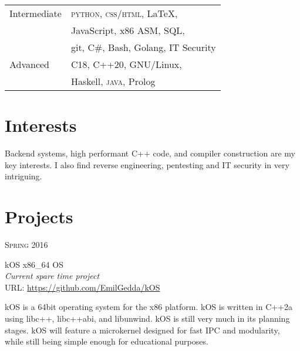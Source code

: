 \documentclass[10pt]{article} %
\begin{document}
{\begin{minipage}[t]{0.44\textwidth}
\begin{tabular}{ll}
Intermediate
& \textsc{python}, \textsc{css/html}, \LaTeX,\\
& JavaScript, x86 ASM, SQL,\\
    & git, \textsc{C\#}, Bash, Golang, IT Security \\[4pt]
Advanced
& C18, C++20, GNU/Linux, \\
    & Haskell, \textsc{java}, Prolog \\[4pt]
\end{tabular}


\section{Interests} 

Backend systems, high performant C++ code, and compiler construction are my key
interests. I also find reverse engineering, pentesting and IT security in very intriguing.

\end{minipage} %
\clearpage

\begin{minipage}[t]{0.5\textwidth} %
\section{Projects}

{\raggedleft\textsc{Spring 2016}\par}

{\raggedright\large kOS x86\_64 OS\\ \textit{Current spare time project}  \\ \small URL:
    \href{https://github.com/EmilGedda/kOS}{https://github.com/EmilGedda/kOS} \\[5pt]}

    \normalsize{kOS is a 64bit operating system for the x86 platform. kOS is written in C++2a using libc++, libc++abi, and libunwind. kOS
        is still very much in its planning stages. kOS will feature a microkernel designed for fast IPC and modularity, while still being simple enough for educational purposes.}\\


\end{minipage}}
\end{document}
